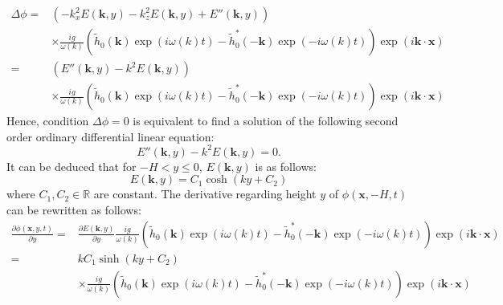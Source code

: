 \documentclass[final]{jcgt}
\begin{document}
\begin{align}
	\Delta \phi\nonumber= & \left(-k_x^2 E(\mathbf{k},y) -k_z^2E(\mathbf{k},y) + E''(\mathbf{k},y)\right)\nonumber                                                                                      \\
	                      & \times \frac{ig}{\omega(k)}\left(\tilde{h}_0(\mathbf{k})\exp(i\omega(k)t)-\tilde{h}_0^*(-\mathbf{k})\exp(-i\omega(k)t)\right)
	\exp\left( i \mathbf{k}\cdot \mathbf{x}\right)\nonumber                                                                                                                                             \\
	=                     & \left(E''(\mathbf{k},y)-k^2E(\mathbf{k},y)\right) \nonumber                                                                                                                 \\
	                      & \times \frac{ig}{\omega(k)}\left(\tilde{h}_0(\mathbf{k})\exp(i\omega(k)t)-\tilde{h}_0^*(-\mathbf{k})\exp(-i\omega(k)t)\right) \exp\left(i \mathbf{k}\cdot \mathbf{x}\right)
\end{align}
Hence, condition $\Delta \phi=0$ is equivalent to find a solution of the following second order ordinary differential linear equation:
\begin{equation}
	E''(\mathbf{k}, y)-k^2E(\mathbf{k}, y) = 0.
\end{equation}
It can be deduced that for $-H<y\leq 0$, $E(\mathbf{k}, y)$ is as follows:
\begin{equation}
	E(\mathbf{k}, y)=C_1\cosh(ky+C_2)
\end{equation}
where $C_1,C_2\in\mathbb{R}$ are constant.
The derivative regarding height $y$ of $\phi(\mathbf{x},-H,t)$ can be rewritten as follows:
\begin{align*}
	\frac{\partial\phi(\mathbf{x},y,t)}{\partial y}= &
	\frac{\partial E(\mathbf{k},y)}{\partial y}\frac{ig}{\omega(k)}\left(\tilde{h}_0(\mathbf{k})\exp(i\omega(k)t)-\tilde{h}_0^*(-\mathbf{k})\exp(-i\omega(k)t)\right)\exp\left(i\mathbf{k}\cdot\mathbf x\right)               \\
	=                                                & kC_1\sinh(ky+C_2)                                                                                                                                                      \\
	                                                 & \times\frac{ig}{\omega(k)}\left(\tilde{h}_0(\mathbf{k})\exp(i\omega(k)t)-\tilde{h}_0^*(-\mathbf{k})\exp(-i\omega(k)t)\right)\exp\left(i\mathbf{k}\cdot\mathbf x\right)
\end{align*}
\end{document}
